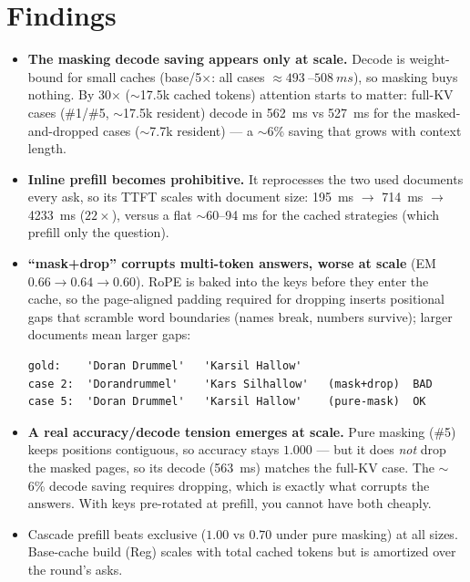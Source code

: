 \documentclass[11pt]{article}
\begin{document}
\section{Findings}
\begin{itemize}
  \item \textbf{The masking decode saving appears only at scale.} Decode is
        weight-bound for small caches (base/5$\times$: all cases
        $\approx\SI{493}{}$--$\SI{508}{ms}$), so masking buys nothing. By
        30$\times$ ($\sim$17.5k cached tokens) attention starts to matter: full-KV
        cases (\#1/\#5, $\sim$17.5k resident) decode in \SI{562}{ms} vs
        \SI{527}{ms} for the masked-and-dropped cases ($\sim$7.7k resident) ---
        a $\sim$6\% saving that grows with context length.
  \item \textbf{Inline prefill becomes prohibitive.} It reprocesses the two used
        documents every ask, so its TTFT scales with document size:
        \SI{195}{ms} $\rightarrow$ \SI{714}{ms} $\rightarrow$ \SI{4233}{ms}
        ($22\times$), versus a flat $\sim$60--94 ms for the cached strategies
        (which prefill only the question).
  \item \textbf{``mask+drop'' corrupts multi-token answers, worse at scale} (EM
        $0.66\rightarrow0.64\rightarrow0.60$). RoPE is baked into the keys before
        they enter the cache, so the page-aligned padding required for dropping
        inserts positional gaps that scramble word boundaries (names break, numbers
        survive); larger documents mean larger gaps:
\begin{lstlisting}
gold:    'Doran Drummel'   'Karsil Hallow'
case 2:  'Dorandrummel'    'Kars Silhallow'   (mask+drop)  BAD
case 5:  'Doran Drummel'   'Karsil Hallow'    (pure-mask)  OK
\end{lstlisting}
  \item \textbf{A real accuracy/decode tension emerges at scale.} Pure masking
        (\#5) keeps positions contiguous, so accuracy stays $1.000$ --- but it does
        \emph{not} drop the masked pages, so its decode (\SI{563}{ms}) matches the
        full-KV case. The $\sim$6\% decode saving requires dropping, which is exactly
        what corrupts the answers. With keys pre-rotated at prefill, you cannot have
        both cheaply.
  \item Cascade prefill beats exclusive ($1.00$ vs $0.70$ under pure masking) at
        all sizes. Base-cache build (Reg) scales with total cached tokens but is
        amortized over the round's asks.
\end{itemize}
\end{document}
